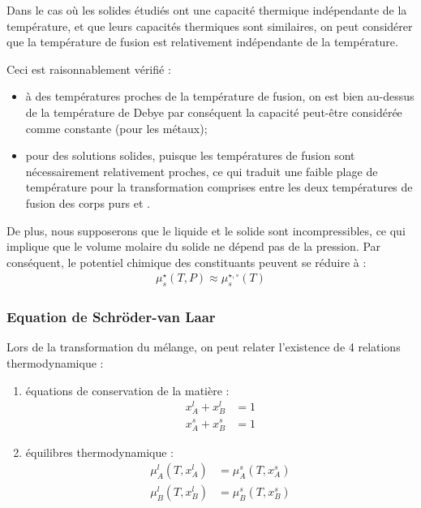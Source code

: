 \documentclass[a4paper]{book}
\begin{document}
Dans le cas où les solides étudiés ont une capacité thermique indépendante de la température, et que leurs capacités thermiques sont similaires, on peut considérer que la température de fusion est relativement indépendante de la température.

Ceci est raisonnablement vérifié : 
\begin{itemize}
\item à des températures proches de la température de fusion, on est bien au-dessus de la température de Debye par conséquent la capacité peut-être considérée comme constante (pour les métaux);
\item pour des solutions solides, puisque les températures de fusion sont nécessairement relativement proches, ce qui traduit une faible plage de température pour la transformation comprises entre les deux températures de fusion des corps purs  et .
\end{itemize}

De plus, nous supposerons que le liquide et le solide sont incompressibles, ce qui implique que le volume molaire du solide ne dépend pas de la pression. Par conséquent, le potentiel chimique des constituants peuvent se réduire à : 
\begin{align*}
\mu_s^\star (T, P) \approx \mu_s^{\star, \circ} (T)
\end{align*}

\subsubsection{Equation de Schröder-van Laar}

Lors de la transformation du mélange, on peut relater l'existence de 4 relations thermodynamique : 
\begin{enumerate}
\item équations de conservation de la matière : 
\begin{align*}
x_A^l + x_B^l &= 1 \\
x_A^s + x_B^s &= 1
\end{align*}
\item équilibres thermodynamique :
\begin{align*}
\mu_A^l (T, x_A^l) &= \mu_A^s (T, x_A^s) \\
\mu_B^l (T, x_B^l) &= \mu_B^s (T, x_B^s)
\end{align*}
\end{enumerate}
\end{document}
